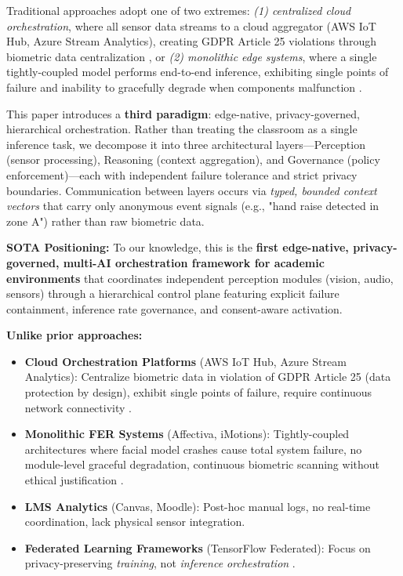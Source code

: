 \documentclass[conference]{IEEEtran}
\begin{document}
Traditional approaches adopt one of two extremes: \textit{(1) centralized cloud orchestration}, where all sensor data streams to a cloud aggregator (AWS IoT Hub, Azure Stream Analytics), creating GDPR Article 25 violations through biometric data centralization \cite{b4, b17}, or \textit{(2) monolithic edge systems}, where a single tightly-coupled model performs end-to-end inference, exhibiting single points of failure and inability to gracefully degrade when components malfunction \cite{b5}.

This paper introduces a \textbf{third paradigm}: edge-native, privacy-governed, hierarchical orchestration. Rather than treating the classroom as a single inference task, we decompose it into three architectural layers—Perception (sensor processing), Reasoning (context aggregation), and Governance (policy enforcement)—each with independent failure tolerance and strict privacy boundaries. Communication between layers occurs via \textit{typed, bounded context vectors} that carry only anonymous event signals (e.g., "hand raise detected in zone A") rather than raw biometric data.

\textbf{SOTA Positioning:} To our knowledge, this is the \textbf{first edge-native, privacy-governed, multi-AI orchestration framework for academic environments} that coordinates independent perception modules (vision, audio, sensors) through a hierarchical control plane featuring explicit failure containment, inference rate governance, and consent-aware activation.

\textbf{Unlike prior approaches:}
\begin{itemize}
\item \textbf{Cloud Orchestration Platforms} (AWS IoT Hub, Azure Stream Analytics): Centralize biometric data in violation of GDPR Article 25 (data protection by design), exhibit single points of failure, require continuous network connectivity \cite{b6, b15}.
\item \textbf{Monolithic FER Systems} (Affectiva, iMotions): Tightly-coupled architectures where facial model crashes cause total system failure, no module-level graceful degradation, continuous biometric scanning without ethical justification \cite{b7}.
\item \textbf{LMS Analytics} (Canvas, Moodle): Post-hoc manual logs, no real-time coordination, lack physical sensor integration.
\item \textbf{Federated Learning Frameworks} (TensorFlow Federated): Focus on privacy-preserving \textit{training}, not \textit{inference orchestration} \cite{b8}.
\end{itemize}
\end{document}

